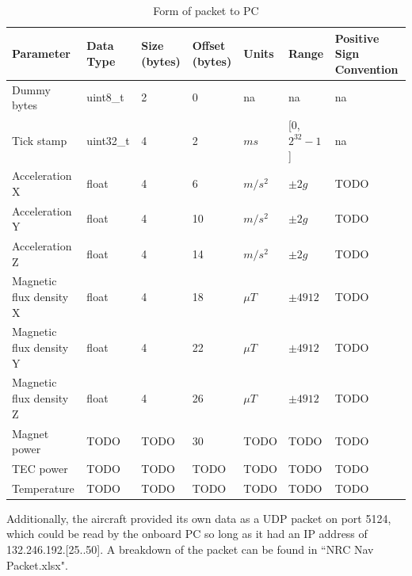 \documentclass{article}
\begin{document}
\begin{table}[!ht]
	\centering
	\begin{tabular}{ | m{4cm} | m{2cm} | m{2cm} | m{2cm}| m{1cm}| m{2cm}| m{2cm}|  } 
		\hline
		Parameter & Data Type & Size (bytes) & Offset (bytes) & Units & Range & Positive Sign Convention \\
		\hline
		Dummy bytes & uint8\_t & 2 & 0 & na & na & na \\
		\hline
		Tick stamp & uint32\_t & 4 & 2 & $ms$ & [0, $2^{32}-1$] & na \\ 
		\hline
		Acceleration X & float & 4 & 6 & $m/s^2$ & $\pm 2g$ & TODO \\ 
		\hline
		Acceleration Y & float & 4 & 10 & $m/s^2$ & $\pm 2g$ & TODO \\ 
		\hline
		Acceleration Z & float & 4 & 14 & $m/s^2$ & $\pm 2g$ & TODO \\ 
		\hline
		Magnetic flux density X & float & 4 & 18 & $\mu T$ & $\pm 4912$ & TODO \\ 
		\hline
		Magnetic flux density Y & float & 4 & 22 & $\mu T$ & $\pm 4912$ & TODO \\ 
		\hline
		Magnetic flux density Z & float & 4 & 26 & $\mu T$ & $\pm 4912$ & TODO \\ 
		\hline
		Magnet power & TODO & TODO & 30 & TODO & TODO & TODO \\ 
		\hline
	    TEC power & TODO & TODO & TODO & TODO & TODO & TODO \\ 
		\hline
		Temperature & TODO & TODO & TODO & TODO & TODO & TODO \\ 
		\hline
		
	\end{tabular}
	\caption{Form of packet to PC}
	\label{tab:PCPacketFormat}
\end{table}

Additionally, the aircraft provided its own data as a UDP packet on port 5124, which could be read by the onboard PC so long as it had an IP address of 132.246.192.[25..50]. A breakdown of the packet can be found in ``NRC Nav Packet.xlsx".
\clearpage

\end{document}
